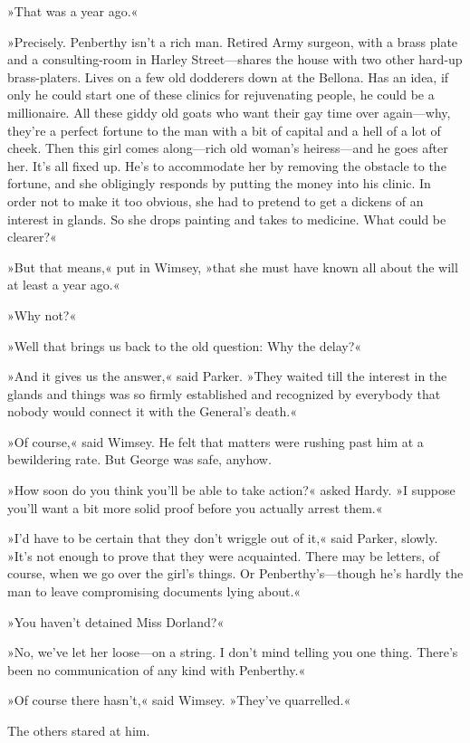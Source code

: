 »That was a year ago.«

»Precisely. Penberthy isn't a rich man. Retired Army surgeon, with a brass plate and a consulting-room in Harley Street—shares the house with two other hard-up brass-platers. Lives on a few old dodderers down at the Bellona. Has an idea, if only he could start one of these clinics for rejuvenating people, he could be a millionaire. All these giddy old goats who want their gay time over again—why, they're a perfect fortune to the man with a bit of capital and a hell of a lot of cheek. Then this girl comes along—rich old woman's heiress—and he goes after her. It's all fixed up. He's to accommodate her by removing the obstacle to the fortune, and she obligingly responds by putting the money into his clinic. In order not to make it too obvious, she had to pretend to get a dickens of an interest in glands. So she drops painting and takes to medicine. What could be clearer?«

»But that means,« put in Wimsey, »that she must have known all about the will at least a year ago.«

»Why not?«

»Well that brings us back to the old question: Why the delay?«

»And it gives us the answer,« said Parker. »They waited till the interest in the glands and things was so firmly established and recognized by everybody that nobody would connect it with the General's death.«

»Of course,« said Wimsey. He felt that matters were rushing past him at a bewildering rate. But George was safe, anyhow.

»How soon do you think you'll be able to take action?« asked Hardy. »I suppose you'll want a bit more solid proof before you actually arrest them.«

»I'd have to be certain that they don't wriggle out of it,« said Parker, slowly. »It's not enough to prove that they were acquainted. There may be letters, of course, when we go over the girl's things. Or Penberthy's—though he's hardly the man to leave compromising documents lying about.«

»You haven't detained Miss Dorland?«

»No, we've let her loose—on a string. I don't mind telling you one thing. There's been no communication of any kind with Penberthy.«

»Of course there hasn't,« said Wimsey. »They've quarrelled.«

The others stared at him.

